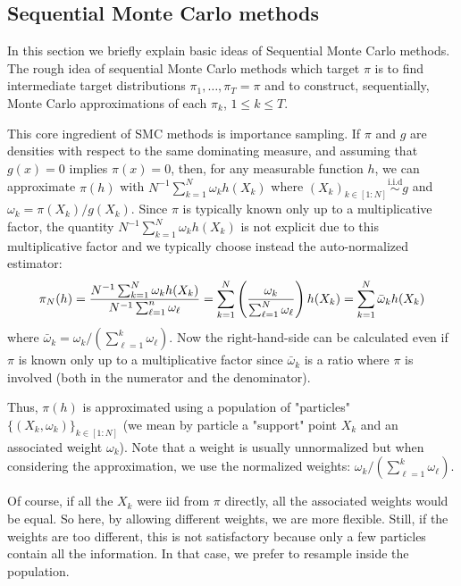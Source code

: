 \documentclass[english,graybox,envcountchap,envcountsame,sectrefs,shortlabels]{svmono}
\theoremstyle{style}
\newcommand{\iid}{\stackrel{\mathrm{i.i.d}}{\sim}}
\begin{document}
\subsection{Sequential Monte Carlo methods}
In this section we briefly explain basic ideas of Sequential Monte Carlo methods.
The rough idea of sequential Monte Carlo methods which target $\pi$ is to find intermediate target distributions $\pi_1, \ldots , \pi_T=\pi$ and to construct, sequentially, Monte Carlo approximations of each $\pi_k$, $1\leq k \leq T$.




This core ingredient of SMC methods is importance sampling. If $\pi$ and $g$ are densities with respect to  the same dominating measure, and assuming that $g(x)=0$ implies $\pi(x)=0$, then, for any measurable function $h$, we can approximate $\pi(h)$ with $N^{-1}\sum_{k=1}^N \omega_k h(X_k)$ where $(X_k)_{k\in[1:N]} \iid g$ and $\omega_k=\pi(X_k)/g(X_k)$. Since $\pi$ is typically known only up to a multiplicative factor, the quantity $N^{-1}\sum_{k=1}^N \omega_k h(X_k)$ is not explicit due to this multiplicative factor and we typically choose instead the auto-normalized estimator:
$$
\pi_N(h) = \frac{N^{-1}\sum_{k=1}^N \omega_k h(X_k)}{N^{-1}\sum_{\ell=1}^n \omega_\ell}=\sum_{k=1}^N \left(\frac{ \omega_k}{\sum_{\ell=1}^N \omega_\ell}\right)  h(X_k)=\sum_{k=1}^N \bar\omega_k  h(X_k)
$$
where  $\bar \omega_k=\omega_k/(\sum_{\ell=1}^{k} \omega_\ell)$. Now the right-hand-side can be calculated even if $\pi$ is known only up to a multiplicative factor since $\bar \omega_k$ is a ratio where $\pi$ is involved (both in the numerator and the denominator).

Thus, $\pi(h)$ is approximated using a population of "particles" $\{(X_k,\omega_k)\}_{k\in[1:N]}$ (we mean by particle a "support" point $X_k$ and an associated weight $\omega_k$). Note that a weight is usually unnormalized but when considering the approximation, we use the normalized weights: $\omega_k/(\sum_{\ell=1}^{k} \omega_\ell)$.

Of course, if all the $X_k$ were iid from $\pi$ directly, all the associated weights would be equal. So here, by allowing different weights, we are more flexible. Still, if the weights are too different, this is not satisfactory because only a few particles contain all the information. In that case, we prefer to resample inside the population. 
\end{document}
